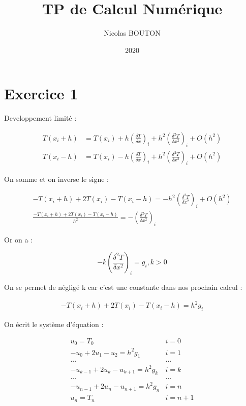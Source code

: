 \documentclass[11pt]{article}
\author{Nicolas BOUTON}
\date{2020}
\title{TP de Calcul Numérique}
\begin{document}
\maketitle
\tableofcontents


\section{Exercice 1}
\label{sec:orgc2bf58d}

Developpement limité : 

\begin{equation*}
\begin{split}
T(x_i + h) & = T(x_i) + h \left(\frac{\delta T}{\delta x} \right)_i + h^2 \left(\frac{\delta^2 T}{\delta x^2} \right)_i + O(h^2) \\
T(x_i - h) & = T(x_i) - h \left(\frac{\delta T}{\delta x} \right)_i + h^2 \left(\frac{\delta^2 T}{\delta x^2} \right)_i + O(h^2)
\end{split}
\end{equation*}

On somme et on inverse le signe :

\begin{equation*}
\begin{split}
- T(x_i + h) + 2 T(x_i) - T(x_i - h) = - h^2 \left(\frac{\delta^2 T}{\delta x^2} \right)_i + O(h^2) \\
\frac{- T(x_i + h) + 2 T(x_i) - T(x_i - h)}{h^2} = - \left(\frac{\delta^2 T}{\delta x^2} \right)_i
\end{split}
\end{equation*}

Or on a :

\begin{equation*}
- k \left( \frac{\delta^2 T}{\delta x^2} \right)_i = g_i, k > 0
\end{equation*}

On se permet de négligé k car c'est une constante dans nos prochain calcul :

\begin{equation*}
\begin{split}
- T(x_i + h) + 2 T(x_i) - T(x_i - h) = h^2 g_i
\end{split}
\end{equation*}

On écrit le système d'équation : 

\begin{equation*}
\begin{array}{ll}
u_0 = T_0 & i = 0 \\
- u_0 + 2 u_1 - u_2 = h^2 g_1 & i = 1\\
... & ... \\
- u_{k-1} + 2 u_k - u_{k+1} = h^2 g_k & i = k\\
... & ... \\
- u_{n-1} + 2 u_n - u_{n+1} = h^2 g_n & i = n\\
u_n = T_n & i = n + 1 \\
\end{array}
\end{equation*}
\end{document}
